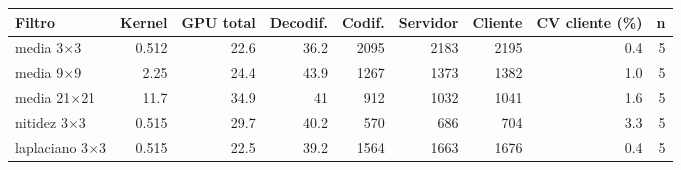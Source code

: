\begin{tabular}{lrrrrrrrr}
\toprule
Filtro & Kernel & GPU total & Decodif. & Codif. & Servidor & Cliente & CV cliente (\%) & n \\
\midrule
media 3$\times$3 & 0.512 & 22.6 & 36.2 & 2095 & 2183 & 2195 & 0.4 & 5 \\
media 9$\times$9 & 2.25 & 24.4 & 43.9 & 1267 & 1373 & 1382 & 1.0 & 5 \\
media 21$\times$21 & 11.7 & 34.9 & 41 & 912 & 1032 & 1041 & 1.6 & 5 \\
nitidez 3$\times$3 & 0.515 & 29.7 & 40.2 & 570 & 686 & 704 & 3.3 & 5 \\
laplaciano 3$\times$3 & 0.515 & 22.5 & 39.2 & 1564 & 1663 & 1676 & 0.4 & 5 \\
\bottomrule
\end{tabular}
